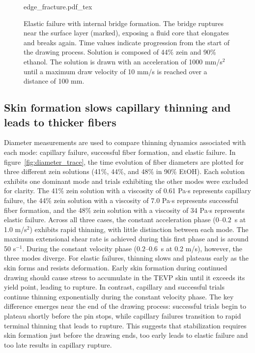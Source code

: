 \documentclass[lineno]{JFM-FLM_Au}
\begin{document}
\begin{figure}[tbp]
    \centering
    \def\svgwidth{0.8\textwidth} %
    {edge_fracture.pdf_tex}
	\caption{
		Elastic failure with internal bridge formation. The bridge ruptures near the surface layer (marked), exposing a fluid core that elongates and breaks again. 
		Time values indicate progression from the start of the drawing process.
		Solution is composed of 44\% zein and 90\% ethanol.
		The solution is drawn with an acceleration of 1000 mm/s$^2$ until a maximum draw velocity of 10 mm/s is reached over a distance of 100 mm.
	}
	\label{fig:skin}
\end{figure}

\subsection{Skin formation slows capillary thinning and leads to thicker fibers}
Diameter measurements are used to compare thinning dynamics associated with each mode: capillary failure, successful fiber formation, and elastic failure. In figure~\ref{fig:diameter_trace}, the time evolution of fiber diameters are plotted for three different zein solutions (41\%, 44\%, and 48\% in 90\% EtOH). Each solution exhibits one dominant mode and trials exhibiting the other modes were excluded for clarity. The 41\% zein solution with a viscosity of 0.61 Pa$\cdot$s represents capillary failure, the 44\% zein solution with a viscosity of 7.0 Pa$\cdot$s represents successful fiber formation, and the 48\% zein solution with a viscosity of 34 Pa$\cdot$s represents elastic failure. Across all three cases, the constant acceleration phase ($0$--$0.2$~s at 1.0 m/s$^2$) exhibits rapid thinning, with little distinction between each mode. The maximum extensional shear rate is achieved during this first phase and is around 50 s$^{-1}$. During the constant velocity phase ($0.2$--$0.6$~s at 0.2 m/s), however, the three modes diverge. For elastic failures, thinning slows and plateaus early as the skin forms and resists deformation. Early skin formation during continued drawing  should cause stress to accumulate in the TEVP skin until it exceeds its yield point, leading to rupture. %
In contrast, capillary and successful trials continue thinning exponentially during the constant velocity phase. The key difference emerges near the end of the drawing process: successful trials begin to plateau shortly before the pin stops, while capillary failures transition to rapid terminal thinning that leads to rupture. This suggests that stabilization requires skin formation just before the drawing ends, too early leads to elastic failure and too late results in capillary rupture.
\end{document}
